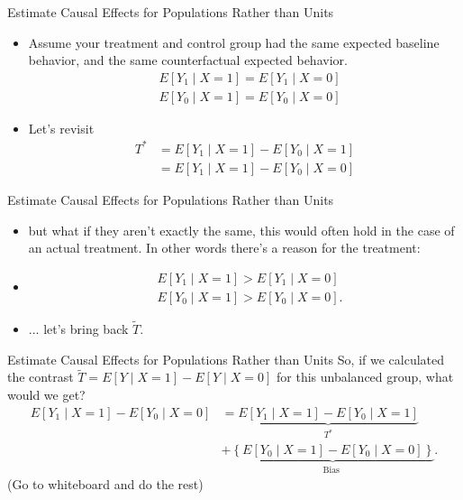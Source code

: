 \documentclass{beamer}
\begin{document}
\begin{frame}{Estimate Causal Effects for Populations Rather than Units}
  \begin{itemize}
    \item<+-> Assume your treatment and control group had the same expected baseline behavior, and the same counterfactual expected behavior.
    $$
    \begin{aligned}
    & E\left[Y_1 \mid X=1\right]=E\left[Y_1 \mid X=0\right] \\
    & E\left[Y_0 \mid X=1\right]=E\left[Y_0 \mid X=0\right]
    \end{aligned}
    $$
    \item<+-> Let's revisit $$ \begin{aligned}
      T^* & = E\left[Y_1 \mid X=1\right]-E\left[Y_0 \mid X=1\right] \\
          & = E\left[Y_1 \mid X=1\right]-E\left[Y_0 \mid X=0\right] 
    \end{aligned} $$
  \end{itemize}
\end{frame}

\begin{frame}{Estimate Causal Effects for Populations Rather than Units}
  \begin{itemize}
    \item<+-> but what if they aren't exactly the same, this would often hold in the case of an actual treatment. In other words there's a reason for the treatment:
    \item<+-> $$
    \begin{aligned}
    & E\left[Y_1 \mid X=1\right]>E\left[Y_1 \mid X=0\right] \\
    & E\left[Y_0 \mid X=1\right]>E\left[Y_0 \mid X=0\right] .
    \end{aligned}
    $$
    \item<+-> ... let's bring back $\tilde{T}$. 
  \end{itemize}
\end{frame}

\begin{frame}{Estimate Causal Effects for Populations Rather than Units}
  So, if we calculated the contrast $\tilde{T}=E[Y \mid X=1]-E[Y \mid X=0]$ for this unbalanced group, what would we get?
  $$
  \begin{aligned}
  E\left[Y_1 \mid X=1\right]-E\left[Y_0 \mid X=0\right] & =\underbrace{E\left[Y_1 \mid X=1\right]-E\left[Y_0 \mid X=1\right]}_{T^*} \\
  & +\underbrace{\left\{E\left[Y_0 \mid X=1\right]-E\left[Y_0 \mid X=0\right]\right\}}_{\text {Bias }} .
  \end{aligned}
  $$
  (Go to whiteboard and do the rest)
\end{frame}
\end{document}
